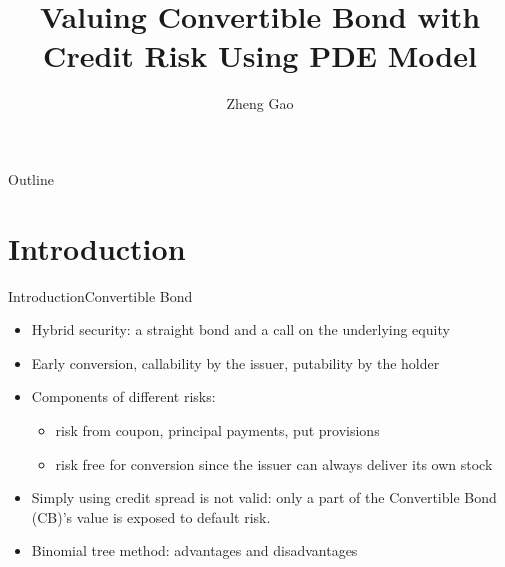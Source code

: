 \documentclass{beamer}
\title[CB pricing \hspace{0.5cm}\insertframenumber/\inserttotalframenumber]{
Valuing Convertible Bond with Credit Risk Using PDE Model}
\author{Zheng Gao}
\institute{}
\date{}
\begin{document}
\begin{frame}
  \titlepage
\end{frame}


\begin{frame}{Outline}
  \tableofcontents
\end{frame}

\section{Introduction}
\begin{frame}{Introduction}{Convertible Bond}
	\begin{itemize}
		\item Hybrid security: a straight bond and a call on the underlying equity
		\item Early conversion, 
			  callability by the issuer, putability by the holder
		\item Components of different risks:
			\begin{itemize}
				\item risk from coupon, principal payments, put provisions
				\item risk free for conversion since the issuer can always deliver its own stock
			\end{itemize}  
		\item Simply using credit spread is not valid: only a part of the Convertible Bond (CB)'s value is exposed to default risk.
		\item Binomial tree method: advantages and disadvantages
	\end{itemize}
\end{frame}
\end{document}
